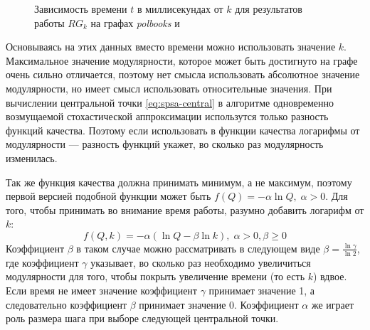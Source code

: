 \begin{figure}[H]
	\columnwidth
	\caption{Зависимость времени $t$ в миллисекундах от $k$ для результатов работы $RG_k$ на графах \emph{polbooks} и \emph{\celegans}}
\end{figure}

Основываясь на этих данных вместо времени можно использовать значение $k$. Максимальное значение модулярности, которое может быть достигнуто на графе очень сильно отличается, поэтому нет смысла использовать абсолютное значение модулярности, но имеет смысл использовать относительные значения. При вычислении центральной точки \eqref{eq:spsa-central} в алгоритме одновременно возмущаемой стохастической аппроксимации использутся только разность функций качества. Поэтому если использовать в функции качества логарифмы от модулярности --- разность функций укажет, во сколько раз модулярность изменилась.

Так же функция качества должна принимать минимум, а не максимум, поэтому первой версией подобной функции может быть $f(Q) = -\alpha \ln Q,\;\alpha > 0$. Для того, чтобы принимать во внимание время работы, разумно добавить логарифм от $k$: 
\begin{equation} \label{eq:arg-f}
f(Q, k) = -\alpha (\ln Q - \beta \ln k),\;\alpha > 0, \beta \ge 0
\end{equation}
Коэффициент $\beta$ в таком случае можно рассматривать в следующем виде $\beta = \frac{\ln \gamma}{\ln 2}$, где коэффициент $\gamma$ указывает, во сколько раз необходимо увеличиться модулярности для того, чтобы покрыть увеличение времени (то есть $k$) вдвое. Если время не имеет значение коэффициент $\gamma$ принимает значение 1, а следовательно коэффициент $\beta$ принимает значение 0. Коэффициент $\alpha$ же играет роль размера шага при выборе следующей центральной точки.

